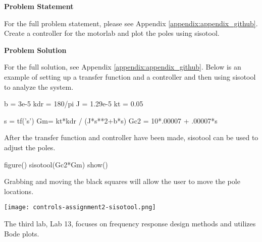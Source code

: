 \begin{tcolorbox}[breakable, enhanced jigsaw, title=ME 570: Assignment \ref{control_assignment_2}, 
    colframe=ksu-purple, colback=ksu-gray]

    \textbf{Problem Statement}
    \parindent15pt

    For the full problem statement, please see Appendix \ref{appendix:appendix_github}. Create a
    controller for the motorlab and plot the poles using sisotool.
    
    \tcblower
    \textbf{Problem Solution}
    \parindent15pt

    For the full solution, see Appendix \ref{appendix:appendix_github}. Below is an example of 
    setting up a transfer function and a controller and then using sisotool to analyze the system.

\begin{python}
b = 3e-5
kdr = 180/pi
J = 1.29e-5
kt = 0.05

s = tf('s')
Gm= kt*kdr / (J*s**2+b*s)
Gc2 = 10*.00007 + .00007*s
\end{python}

After the transfer function and controller have been made, sisotool can be used to adjust the poles.

\begin{python}
figure()
sisotool(Gc2*Gm)
show()
\end{python}

Grabbing and moving the black squares will allow the user to move the pole locations.

\begin{center}
    \texttt{[image: controls-assignment2-sisotool.png]}
\end{center}
\end{tcolorbox}

The third lab, Lab 13, focuses on frequency response design methods and utilizes Bode plots.







\label{control_assignment_3}

